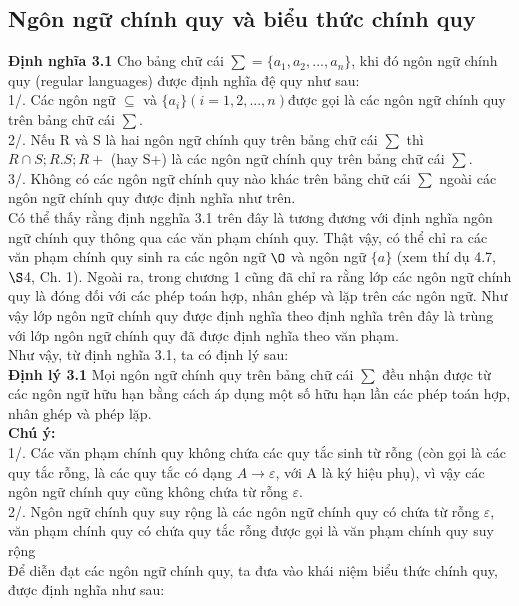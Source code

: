 \begin{flushleft}
\subsection{Ngôn ngữ chính quy và biểu thức chính quy}
\textbf{Định nghĩa 3.1} Cho bảng chữ cái $\sum = \{a_1, a_2,..., a_n\}$, khi đó ngôn ngữ chính quy (regular languages) được định nghĩa đệ quy như sau:\\
\hspace{10mm} 1/. Các ngôn ngữ $\subseteq$ và $\{a_i\} ( i = 1, 2,..., n) $được gọi là các ngôn ngữ chính quy trên bảng chữ cái $\sum$.\\
\hspace{10mm} 2/. Nếu R và S là hai ngôn ngữ chính quy trên bảng chữ cái $\sum$ thì $R \cap S; R.S; R+$ (hay S+) là các ngôn ngữ chính quy trên bảng chữ cái $\sum$.\\
\hspace{10mm}3/. Không có các ngôn ngữ chính quy nào khác trên bảng chữ cái $\sum$ ngoài các ngôn ngữ chính quy được định nghĩa như trên.\\
Có thể thấy rằng định ngghĩa 3.1 trên đây là tương đương với định nghĩa ngôn ngữ chính quy thông qua các văn phạm chính quy. Thật vậy, có thể chỉ ra các văn phạm chính quy sinh ra các ngôn ngữ $\O$ và ngôn ngữ $\{a\}$ (xem thí dụ 4.7, $\S$4, Ch. 1). Ngoài ra, trong chương 1 cũng đã chỉ ra rằng lớp các ngôn ngữ chính quy là đóng đối với các phép toán hợp, nhân ghép và lặp trên các ngôn ngữ. Như vậy lớp ngôn ngữ chính quy được định nghĩa theo định nghĩa trên đây là trùng với lớp ngôn ngữ chính quy đã được định nghĩa theo văn phạm.\\
Như vậy, từ định nghĩa 3.1, ta có định lý sau:\\
\textbf{Định lý 3.1} Mọi ngôn ngữ chính quy trên bảng chữ cái $\sum$ đều nhận được từ các ngôn ngữ hữu hạn bằng cách áp dụng một số hữu hạn lần các phép toán hợp, nhân ghép và phép lặp.\\
\textbf{Chú ý:} \\
1/. Các văn phạm chính quy không chứa các quy tắc sinh từ rỗng (còn gọi là các quy tắc rỗng, là các quy tắc có dạng $A \to \varepsilon$, với A là ký hiệu phụ), vì vậy các ngôn ngữ chính quy cũng không chứa từ rỗng $\varepsilon$.\\
2/. Ngôn ngữ chính quy suy rộng là các ngôn ngữ chính quy có chứa từ rỗng $\varepsilon$, văn phạm chính quy có chứa quy tắc rỗng được gọi là văn phạm chính quy suy rộng\\
Để diễn đạt các ngôn ngữ chính quy, ta đưa vào khái niệm biểu thức chính quy, được định nghĩa như sau:\\

\end{flushleft}
